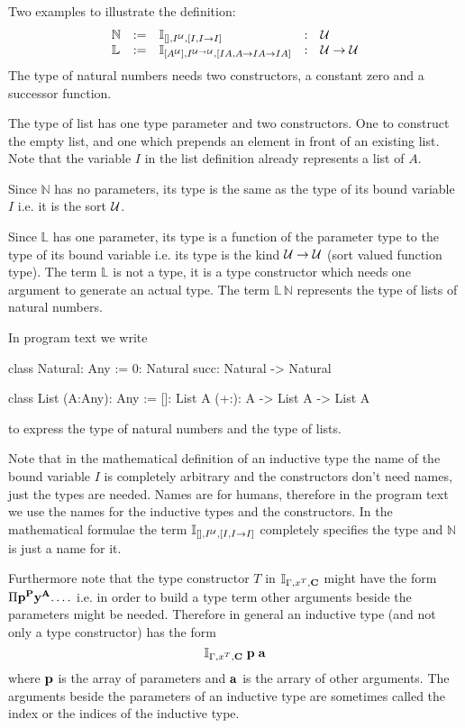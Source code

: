 \begin{description}
  Two examples to illustrate the definition:
  $$
  \begin{array}{lllll}
    \mathbb{N}
    &:=& \mathbb{I}_{[], I^{\cal{U}}, [I, I \to I]}
    &:& {\cal{U}}
    \\
    \mathbb{L}
    &:=& \mathbb{I}_{[A^{\cal{U}}],  I^{{\cal{U}}\to{\cal{U}}},  [IA, A \to IA \to IA]}
    &:& {\cal{U}} \to {\cal{U}}
  \end{array}
  $$
  The type of natural numbers needs two constructors, a constant zero and a
  successor function.

  The type of list has one type parameter and two constructors. One to
  construct the empty list, and one which prepends an element in front of an
  existing list. Note that the variable $I$ in the list definition already
  represents a list of $A$.

  Since $\mathbb{N}$ has no parameters, its type is the same as the type of
  its bound variable $I$ i.e. it is the sort ${\cal{U}}$.

  Since $\mathbb{L}$ has one parameter, its type is a function of the
  parameter type to the type of its bound variable i.e. its type is the kind
  ${\cal{U}} \to {\cal{U}}$ (sort valued function type). The term $\mathbb{L}$ is not a
  type, it is a type constructor which needs one argument to generate an
  actual type. The term $\mathbb{L} \, \mathbb{N}$ represents the type of
  lists of natural numbers.

  In program text we write
  \begin{alba}
      class Natural: Any
      :=
            0: Natural
            succ: Natural -> Natural

      class List (A:Any): Any :=
            []: List A
            (+:): A -> List A -> List A
  \end{alba}
  to express the type of natural numbers and the type of lists.

  Note that in the mathematical definition of an inductive type the name of
  the bound variable $I$ is completely arbitrary and the constructors don't
  need names, just the types are needed. Names are for humans, therefore in
  the program text we use the names for the inductive types and the
  constructors. In the mathematical formulae the term
  $\mathbb{I}_{[], I^{\cal{U}}, [I, I \to I]}$ completely specifies the type and
  $\mathbb{N}$ is just a name for it.

  Furthermore note that the type constructor $T$ in $\mathbb{I}_{\Gamma, x^T,
  \mathbf{C}}$ might have the form $\Pi \mathbf{p}^{\mathbf{P}} \mathbf{y}^{\mathbf{A}}. \ldots$ i.e. in
  order to build a type term other arguments beside the parameters might be
  needed.  Therefore in general an inductive type (and not only a type
  constructor) has the form $$ \mathbb{I}_{\Gamma, x^T, \mathbf{C}} \; \mathbf{p} \;
  \mathbf{a} $$ where $\mathbf{p}$ is the array of parameters and $\mathbf{a}$ is the arrary
  of other arguments. The arguments beside the parameters of an inductive type
  are sometimes called the index or the indices of the inductive type.



\end{description}
